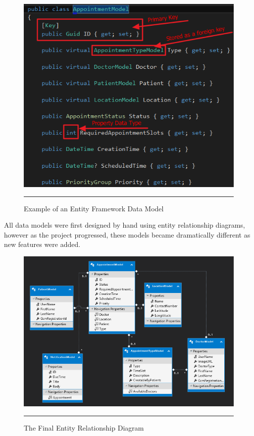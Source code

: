 \begin{figure}[htbp]
	\centering
		\includegraphics[width=\textwidth,height=\textheight,keepaspectratio]{Figures/EFModel.png}
		\rule{35em}{0.5pt}
		\caption[Example of an Entity Framework Data Model]{Example of an Entity Framework Data Model}
	\label{fig:efmodel}
\end{figure}

All data models were first designed by hand using entity relationship diagrams, however as the project progressed, these models became dramatically different as new features were added.

\begin{figure}[htbp]
	\centering
		\includegraphics[width=\textwidth,height=\textheight,keepaspectratio]{Figures/database.png}
		\rule{35em}{0.5pt}
		\caption[The Final Entity Relationship Diagram]{The Final Entity Relationship Diagram}
	\label{fig:erdiagram}
\end{figure}

